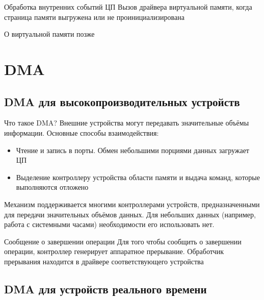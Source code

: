 \documentclass[xetex,aspectratio=43]{beamer}
\begin{document}
\begin{frame}{Обработка внутренних событий ЦП}
	Вызов драйвера виртуальной памяти, когда страница памяти выгружена или
	не проинициализирована

	\pause

	О виртуальной памяти позже
\end{frame}

\section{DMA}

\subsection{DMA для высокопроизводительных устройств}

\begin{frame}{Что такое DMA?}
	Внешние устройства могут передавать значительные объёмы информации.
	Основные способы взаимодействия:

	\begin{itemize}
		\tightlist
		\item
		Чтение и запись в порты. Обмен небольшими порциями данных загружает ЦП
		\item
		Выделение контроллеру устройства области памяти и выдача команд,
		которые выполняются отложено
	\end{itemize}

	\pause


	Механизм поддерживается многими контроллерами устройств,
	предназначенными для передачи значительных объёмов данных. Для небольших данных (например, работа с системными часами) необходимости его использовать нет.
\end{frame}

\begin{frame}{Сообщение о завершении операции}
	Для того чтобы сообщить о завершении операции, контроллер генерирует
	аппаратное прерывание. Обработчик прерывания находится в драйвере
	соответствующего устройства
\end{frame}

\subsection{DMA для устройств реального времени}
\end{document}
